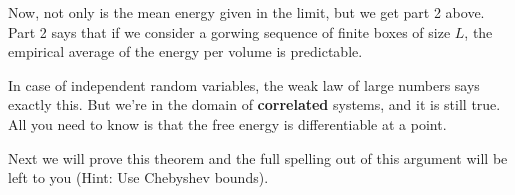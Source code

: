 Now, not only is the mean energy given in the limit, but we get part 2 above. Part 2 says that if we consider a gorwing sequence of finite boxes of size $L$, the empirical average of the energy per volume is predictable. 

In case of independent random variables, the weak law of large numbers says exactly this. But we're in the domain of \textbf{correlated} systems, and it is still true. All you need to know is that the free energy is differentiable at a point. 

Next we will prove this theorem and the full spelling out of this argument will be left to you (Hint: Use Chebyshev bounds). 







